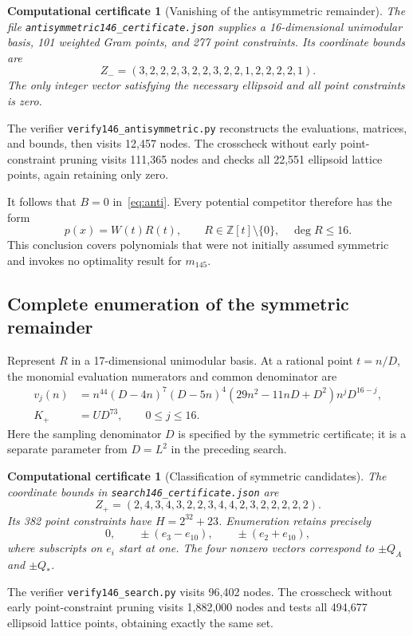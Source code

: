 \documentclass[11pt,a4paper]{article}
\newtheorem{certificate}[theorem]{Computational certificate}
\newcommand{\Z}{\mathbb Z}
\newcommand{\file}[1]{{\small\nolinkurl{#1}}}
\begin{document}
\begin{certificate}[Vanishing of the antisymmetric remainder]\label{cert:anti}
The file \file{antisymmetric146_certificate.json} supplies a 16-dimensional unimodular basis, 101 weighted Gram points, and 277 point constraints. Its coordinate bounds are
\[
Z_-=(3,2,2,2,3,2,2,3,2,2,1,2,2,2,2,1).
\]
The only integer vector satisfying the necessary ellipsoid and all point constraints is zero.
\end{certificate}
The verifier \file{verify146_antisymmetric.py} reconstructs the evaluations, matrices, and bounds, then visits 12,457 nodes. The crosscheck without early point-constraint pruning visits 111,365 nodes and checks all 22,551 ellipsoid lattice points, again retaining only zero.

It follows that $B=0$ in~\eqref{eq:anti}. Every potential competitor therefore has the form
\begin{equation}\label{eq:symmetric}
p(x)=W(t)R(t),\qquad R\in\Z[t]\setminus\{0\},\quad\deg R\le16.
\end{equation}
This conclusion covers polynomials that were not initially assumed symmetric and invokes no optimality result for $m_{145}$.

\subsection{Complete enumeration of the symmetric remainder}
Represent $R$ in a 17-dimensional unimodular basis. At a rational point $t=n/D$, the monomial evaluation numerators and common denominator are
\begin{align*}
v_j(n)&=n^{44}(D-4n)^7(D-5n)^4(29n^2-11nD+D^2)n^jD^{16-j},\\
K_+&=UD^{73},\qquad 0\le j\le16.
\end{align*}
Here the sampling denominator $D$ is specified by the symmetric certificate; it is a separate parameter from $D=L^2$ in the preceding search.

\begin{certificate}[Classification of symmetric candidates]\label{cert:symmetric}
The coordinate bounds in \file{search146_certificate.json} are
\[
Z_+=(2,4,3,4,3,2,2,3,4,4,2,3,2,2,2,2,2).
\]
Its 382 point constraints have $H=2^{32}+23$. Enumeration retains precisely
\[
0,\qquad\pm(e_3-e_{10}),\qquad\pm(e_2+e_{10}),
\]
where subscripts on $e_i$ start at one. The four nonzero vectors correspond to $\pm Q_A$ and $\pm Q_*$.
\end{certificate}
The verifier \file{verify146_search.py} visits 96,402 nodes. The crosscheck without early point-constraint pruning visits 1,882,000 nodes and tests all 494,677 ellipsoid lattice points, obtaining exactly the same set.
\end{document}
